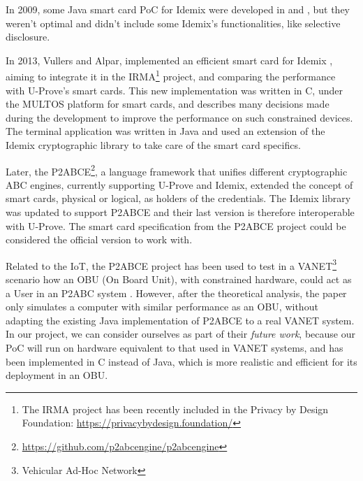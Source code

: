 \documentclass[journal]{IEEEtran}
\begin{document}
In 2009, some Java smart card PoC for Idemix were developed in \cite{javaIdemix1} and \cite{javaIdemix2}, but they weren't optimal and didn't include some Idemix's functionalities, like selective disclosure.

In 2013, Vullers and Alpar, implemented an efficient smart card for Idemix \cite{vullers2013efficient}, aiming to integrate it in the IRMA\footnote{The IRMA project has been recently included in the Privacy by Design Foundation: \url{https://privacybydesign.foundation/}} project, and comparing the performance with U-Prove's smart cards. This new implementation was written in C, under the MULTOS platform for smart cards, and describes many decisions made during the development to improve the performance on such constrained devices. The terminal application was written in Java and used an extension of the Idemix cryptographic library to take care of the smart card specifics.



Later, the P2ABCE\footnote{\url{https://github.com/p2abcengine/p2abcengine}}, a language framework that unifies different cryptographic ABC engines, currently supporting U-Prove and Idemix, extended the concept of smart cards, physical or logical, as holders of the credentials. The Idemix library was updated to support P2ABCE and their last version is therefore interoperable with U-Prove. The smart card specification from the P2ABCE project could be considered the official version to work with.


Related to the IoT, the P2ABCE project has been used to test in a VANET\footnote{Vehicular Ad-Hoc Network} scenario how an OBU (On Board Unit), with constrained hardware, could act as a User in an P2ABC system \cite{vanet}. However, after the theoretical analysis, the paper only simulates a computer with similar performance as an OBU, without adapting the existing Java implementation of P2ABCE to a real VANET system. In our project, we can consider ourselves as part of their \textit{future work}, because our PoC will run on hardware equivalent to that used in VANET systems, and has been implemented in C instead of Java, which is more realistic and efficient for its deployment in an OBU.

\end{document}
